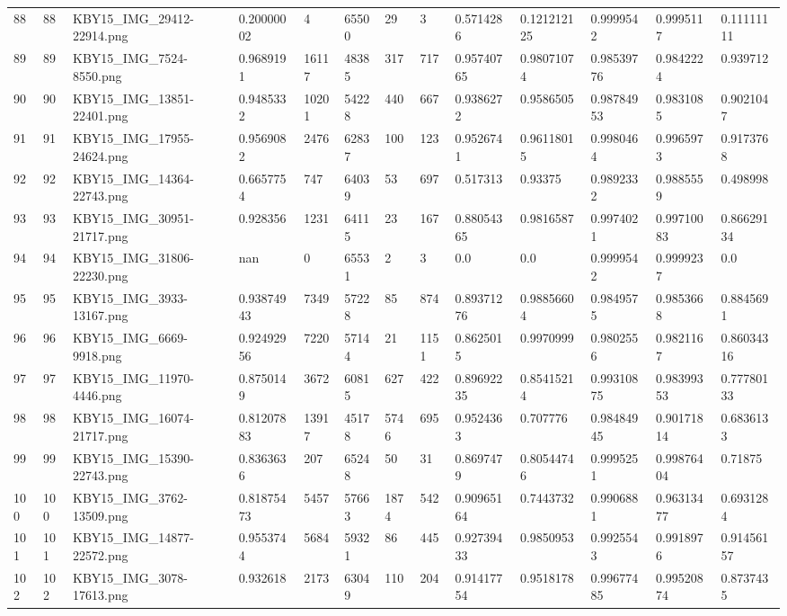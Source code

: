 \documentclass[11pt, a4paper, twoside]{report}
\begin{document}
\begin{longtable}[c]{@{}lllllllllllll@{}}
88 & 88 & KBY15\_IMG\_29412-22914.png & 0.20000002 & 4 & 65500 & 29 & 3 & 0.5714286 & 0.121212125 & 0.9999542 & 0.9995117 & 0.11111111 \\
89 & 89 & KBY15\_IMG\_7524-8550.png & 0.9689191 & 16117 & 48385 & 317 & 717 & 0.95740765 & 0.98071074 & 0.98539776 & 0.9842224 & 0.939712 \\
90 & 90 & KBY15\_IMG\_13851-22401.png & 0.9485332 & 10201 & 54228 & 440 & 667 & 0.9386272 & 0.9586505 & 0.98784953 & 0.9831085 & 0.9021047 \\
91 & 91 & KBY15\_IMG\_17955-24624.png & 0.9569082 & 2476 & 62837 & 100 & 123 & 0.9526741 & 0.96118015 & 0.9980464 & 0.9965973 & 0.9173768 \\
92 & 92 & KBY15\_IMG\_14364-22743.png & 0.6657754 & 747 & 64039 & 53 & 697 & 0.517313 & 0.93375 & 0.9892332 & 0.9885559 & 0.498998 \\
93 & 93 & KBY15\_IMG\_30951-21717.png & 0.928356 & 1231 & 64115 & 23 & 167 & 0.88054365 & 0.9816587 & 0.9974021 & 0.99710083 & 0.86629134 \\
94 & 94 & KBY15\_IMG\_31806-22230.png & nan & 0 & 65531 & 2 & 3 & 0.0 & 0.0 & 0.9999542 & 0.9999237 & 0.0 \\
95 & 95 & KBY15\_IMG\_3933-13167.png & 0.93874943 & 7349 & 57228 & 85 & 874 & 0.89371276 & 0.98856604 & 0.9849575 & 0.9853668 & 0.8845691 \\
96 & 96 & KBY15\_IMG\_6669-9918.png & 0.92492956 & 7220 & 57144 & 21 & 1151 & 0.8625015 & 0.9970999 & 0.9802556 & 0.9821167 & 0.86034316 \\
97 & 97 & KBY15\_IMG\_11970-4446.png & 0.8750149 & 3672 & 60815 & 627 & 422 & 0.89692235 & 0.85415214 & 0.99310875 & 0.98399353 & 0.77780133 \\
98 & 98 & KBY15\_IMG\_16074-21717.png & 0.81207883 & 13917 & 45178 & 5746 & 695 & 0.9524363 & 0.707776 & 0.98484945 & 0.90171814 & 0.6836133 \\
99 & 99 & KBY15\_IMG\_15390-22743.png & 0.8363636 & 207 & 65248 & 50 & 31 & 0.8697479 & 0.80544746 & 0.9995251 & 0.99876404 & 0.71875 \\
100 & 100 & KBY15\_IMG\_3762-13509.png & 0.81875473 & 5457 & 57663 & 1874 & 542 & 0.90965164 & 0.7443732 & 0.9906881 & 0.96313477 & 0.6931284 \\
101 & 101 & KBY15\_IMG\_14877-22572.png & 0.9553744 & 5684 & 59321 & 86 & 445 & 0.92739433 & 0.9850953 & 0.9925543 & 0.9918976 & 0.91456157 \\
102 & 102 & KBY15\_IMG\_3078-17613.png & 0.932618 & 2173 & 63049 & 110 & 204 & 0.91417754 & 0.9518178 & 0.99677485 & 0.99520874 & 0.8737435 \\

\end{longtable}
\end{document}
